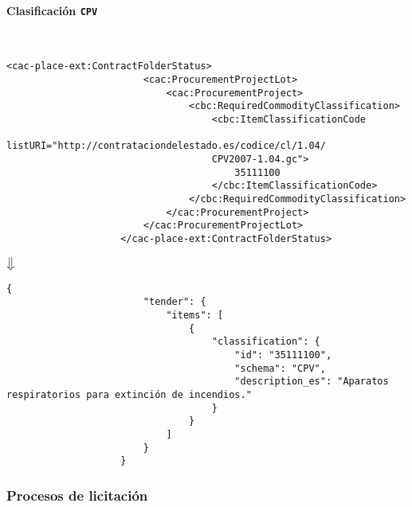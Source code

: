             \paragraph{Clasificación \texttt{CPV}} \mbox{}\\
                \begin{lstlisting}[language=lXML]
                    <cac-place-ext:ContractFolderStatus>
                        <cac:ProcurementProjectLot>
                            <cac:ProcurementProject>
                                <cbc:RequiredCommodityClassification>
                                    <cbc:ItemClassificationCode 
                                    listURI="http://contrataciondelestado.es/codice/cl/1.04/
                                    CPV2007-1.04.gc">
                                        35111100
                                    </cbc:ItemClassificationCode>
                                </cbc:RequiredCommodityClassification>
                            </cac:ProcurementProject>
                        </cac:ProcurementProjectLot>
                    </cac-place-ext:ContractFolderStatus>
                \end{lstlisting}
                
                \begin{center}
                    $\big\Downarrow$
                \end{center}
                
                \begin{lstlisting}[language=lJSON]
                    {
                        "tender": {
                            "items": [
                                {
                                    "classification": {
                                        "id": "35111100",
                                        "schema": "CPV",
                                        "description_es": "Aparatos respiratorios para extinción de incendios."
                                    }
                                }
                            ]
                        }
                    }
                \end{lstlisting}
                
        \subsubsection{Procesos de licitación}
